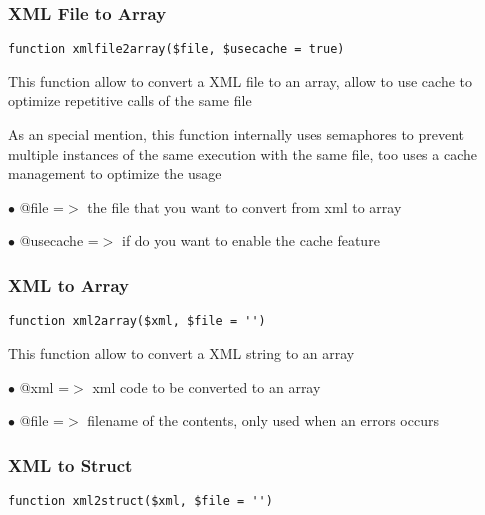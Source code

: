 \documentclass[a4paper]{article}
\begin{document}
\hypertarget{toc279}{}
\subsubsection{XML File to Array}

\begin{lstlisting}
function xmlfile2array($file, $usecache = true)
\end{lstlisting}

This function allow to convert a XML file to an array, allow to use cache to
optimize repetitive calls of the same file

As an special mention, this function internally uses semaphores to prevent
multiple instances of the same execution with the same file, too uses a cache
management to optimize the usage

\begin{compactitem}
\item[\color{myblue}$\bullet$] @file     =$>$ the file that you want to convert from xml to array
\item[\color{myblue}$\bullet$] @usecache =$>$ if do you want to enable the cache feature
\end{compactitem}

\hypertarget{toc280}{}
\subsubsection{XML to Array}

\begin{lstlisting}
function xml2array($xml, $file = '')
\end{lstlisting}

This function allow to convert a XML string to an array

\begin{compactitem}
\item[\color{myblue}$\bullet$] @xml  =$>$ xml code to be converted to an array
\item[\color{myblue}$\bullet$] @file =$>$ filename of the contents, only used when an errors occurs
\end{compactitem}

\hypertarget{toc281}{}
\subsubsection{XML to Struct}

\begin{lstlisting}
function xml2struct($xml, $file = '')
\end{lstlisting}
\end{document}
